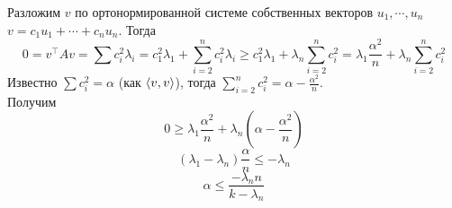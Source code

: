         Разложим $v$ по ортонормированной системе собственных векторов $u_1, \cdots, u_n$ $v = c_1 u_1 + \cdots + c_n u_n$. Тогда
        $$0 = v^{\top}Av = \sum c_i^2 \lambda_i = c_1^2 \lambda_1 + \sum\limits_{i=2}^{n} c_i^2 \lambda_i \ge c_1^2 \lambda_1 + \lambda_n \sum\limits_{i=2}^{n} c_i^2 = \lambda_1 \frac{\alpha^2}{n} +\lambda_n \sum\limits_{i=2}^n c_i^2$$
        Известно $\sum c_i^2 = \alpha$ (как $\left\langle v,v \right\rangle$), тогда $\sum\limits_{i=2}^{n} c_i^2 = \alpha - \frac{\alpha^2}{n}$.\\ Получим $$0 \ge \lambda_1 \frac{\alpha^2}{n} + \lambda_n\left(\alpha - \frac{\alpha^2}{n}\right)$$
         $$(\lambda_1 - \lambda_n)\frac{\alpha}{n} \le -\lambda_n$$
         $$\alpha \le \frac{-\lambda_n n}{k - \lambda_n}$$
        
    \endproof
